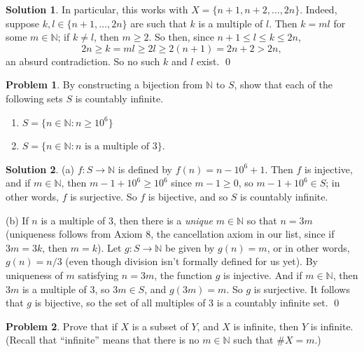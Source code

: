 \documentclass{article}
\numberwithin{equation}{section}
\theoremstyle{plain}
\theoremstyle{definition}
\newtheorem{problem}{Problem}
\newtheorem*{solution*}{Solution}
\newcommand{\N}{\mathbb N}
\begin{document}
\begin{solution*}
	In particular, this works with $X = \{n+1, n+2, \ldots, 2n\}$. Indeed, suppose $k,l \in \{n+1, \ldots, 2n\}$ are such that $k$ is a multiple of $l$. Then $k = ml$ for some $m \in \N$; if $k \neq l$, then $m \geq 2$. So then, since $n+1 \leq l \leq k \leq 2n$,  
	\[
	2n \geq k = ml \geq 2l \geq 2(n+1) = 2n + 2 > 2n,
	\]
	an absurd contradiction. So no such $k$ and $l$ exist. \qed
\end{solution*}

\begin{problem}
	By constructing a bijection from $\N$ to $S$, show that each of the following sets $S$ is countably infinite. 
	\begin{enumerate}[label=(\alph*)]
		\item $S = \{n \in \N : n \geq 10^6\}$ 
		\item $S = \{n \in \N: n \textrm{ is a multiple of 3}\}$. 
	\end{enumerate}
\end{problem}

\begin{solution*}
	(a) $f : S \to \N$ is defined by $f(n) = n - 10^6 + 1$. Then $f$ is injective, and if $m \in \N$, then $m - 1 + 10^6 \geq 10^6$ since $m -1 \geq 0$, so $m-1+10^6 \in S$; in other words, $f$ is surjective. So $f$ is bijective, and so $S$ is countably infinite. 
	
	(b) If $n$ is a multiple of 3, then there is a \emph{unique} $m \in \N$ so that $n = 3m$ (uniqueness follows from Axiom 8, the cancellation axiom in our list, since if $3m = 3k$, then $m=k$). Let $g : S \to \N$ be given by $g(n) = m$, or in other words, $g(n) = n/3$ (even though division isn't formally defined for us yet). By uniqueness of $m$ satisfying $n = 3m$, the function $g$ is injective. And if $m \in \N$, then $3m$ is a multiple of 3, so $3m \in S$, and $g(3m) = m$. So $g$ is surjective. It follows that $g$ is bijective, so the set of all multiples of 3 is a countably infinite set. \qed
\end{solution*}

\begin{problem}\label{prob:18}
	Prove that if $X$ is a subset of $Y$, and $X$ is infinite, then $Y$ is infinite. (Recall that ``infinite'' means that there is no $m \in \N$ such that $\#X = m$.)
\end{problem}
\end{document}
